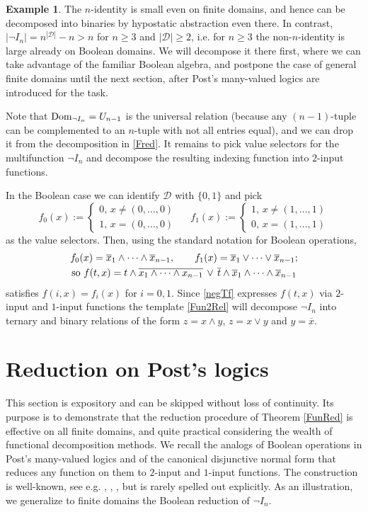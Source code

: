 \documentclass[11pt]{article}
\theoremstyle{plain}
\theoremstyle{definition}
\newtheorem{example}{Example}
\def\D{\mathcal{D}}
\def\nx{\overline{x}}
\def\nt{\overline{t}}
\begin{document}
\begin{example}\label{NegIred2} The $n$-identity is small even on finite domains, and hence can be decomposed into binaries by hypostatic abstraction even there. In contrast, $|\neg I_n|=n^{|\D|}-n>n$ for $n\geq3$ and $|\D|\geq2$, i.e. for $n\geq3$ the non-$n$-identity is large already on Boolean domains. We will decompose it there first, where we can take advantage of the familiar Boolean algebra, and postpone the case of general finite domains until the next section, after Post's many-valued logics are introduced for the task. 

Note that $\textup{Dom}_{\neg I_n}=U_{n-1}$ is the universal relation (because any $(n-1)$-tuple can be complemented to an $n$-tuple with not all entries equal), and we can drop it from the decomposition in \eqref{Fred}. It remains to pick value selectors for the multifunction $\neg I_n$ and decompose the resulting indexing function into $2$-input functions.

In the Boolean case we can identify $\D$ with $\{0,1\}$ and pick  
$$
f_0(x):=\begin{cases}0,\,x\neq(0,\dots,0)\\
1,\,x=(0,\dots,0)\end{cases}\ \ \ \ \ \ 
f_1(x):=\begin{cases}1,\,x\neq(1,\dots,1)\\
0,\,x=(1,\dots,1)\end{cases}
$$
as the value selectors. Then, using the standard notation for Boolean operations,
\begin{gather}
f_0(x)=\nx_1\land\dots\land\nx_{n-1},\ \ \ \ \ \ 
f_1(x)=\nx_1\lor\dots\lor\nx_{n-1};\notag\\\label{negTf}
\text{so }f(t,x)=t\land\overline{x_1\land\dots\land x_{n-1}}\,\lor\,\nt\land\nx_1\land\dots\land\nx_{n-1} 
\end{gather}
satisfies $f(i,x)=f_i(x)$ for $i=0,1$. Since \eqref{negTf} expresses $f(t,x)$ via $2$-input and $1$-input functions the template  \eqref{Fun2Rel} will decompose $\neg I_n$ into ternary and binary relations of the form $z=x\land y$, $z=x\lor y$ and $y=\nx$.
\end{example}


\section{Reduction on Post's logics}\label{PostLog}

This section is expository and can be skipped without loss of continuity. Its purpose is to demonstrate that the reduction procedure of Theorem \ref{FunRed} is effective on all finite domains, and quite practical considering the wealth of functional decomposition methods. We recall the analogs of Boolean operations in Post's many-valued logics and of the canonical disjunctive normal form that reduces any function on them to $2$-input and $1$-input functions. The construction is well-known, see e.g. \cite[1.4]{Lau}, \cite{Ros76}, \cite[2.8]{Urq01}, but is rarely spelled out explicitly. As an illustration, we generalize to finite domains the Boolean reduction of $\neg I_n$.
\end{document}
